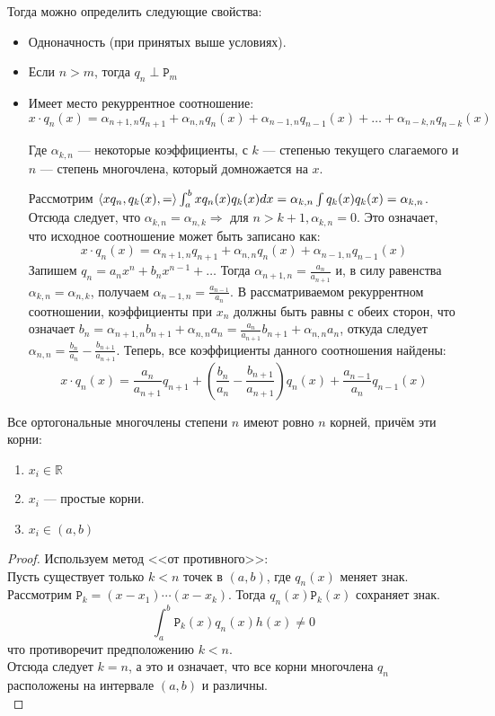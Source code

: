 \documentclass[12pt]{article}
\begin{document}
	Тогда можно определить следующие свойства:
	\begin{itemize}
		\item Одноначность (при принятых выше условиях).
		\item Если $n > m$, тогда $q_n \perp \mathtt{P}_m$
		\item Имеет место рекуррентное соотношение: \\
		$$ x \cdot q_n(x) = 
		\alpha_{n+1,n} q_{n+1} + \alpha_{n,n} q_n(x) + \alpha_{n-1, n} q_{n-1} (x) + \ldots + \alpha_{n-k, n} q_{n-k} (x) $$
		
		Где $\alpha_{k, n}$ --- некоторые коэффициенты, с $k$ --- степенью текущего слагаемого и $n$ --- степень многочлена, который 
		домножается	на $x$.
		
		Рассмотрим $\left\langle x q_n, q_k(x), = \right\rangle \int_a^b x q_n(x) q_k(x) dx = \alpha_{k,n} \int q_k(x) q_k(x) = \alpha_{k,n}$.
		Отсюда следует, что $\alpha_{k,n} = \alpha_{n,k} \Rightarrow$ для $n > k+1,\alpha_{k,n} = 0$. Это означает, что исходное соотношение
		может быть записано как:
		$$ x \cdot q_n(x) = 
		\alpha_{n+1,n} q_{n+1} + \alpha_{n,n} q_n(x) + \alpha_{n-1, n} q_{n-1} (x)$$
		Запишем $q_n = a_n x^n + b_n x^{n-1} + \ldots$
		Тогда $\alpha_{n+1, n} = \frac{a_n}{a_{n+1}}$ и, в силу равенства $\alpha_{k,n} = \alpha_{n,k}$, получаем $\alpha_{n-1, n} 
		= \frac{a_{n-1}}{a_n}$. В рассматриваемом рекуррентном соотношении, коэффициенты при $x_n$ должны быть равны с обеих
		сторон, что означает $b_n = \alpha_{n+1, n} b_{n+1} + \alpha_{n,n} a_n = \frac{a_n}{a_{n+1}} b_{n+1} + \alpha_{n,n} a_n$, 
		откуда следует $\alpha_{n,n} = \frac{b_n}{a_n} - \frac{b_{n+1}}{a_{n+1}}$. Теперь, все коэффициенты данного соотношения
		найдены:
		$$ x \cdot q_n(x) = 
		\frac{a_n}{a_{n+1}} q_{n+1} + (\frac{b_n}{a_n} - \frac{b_{n+1}}{a_{n+1}}) q_n(x) + \frac{a_{n-1}}{a_n} q_{n-1} (x)$$
	\end{itemize}
	
	\begin{state}
		Все ортогональные многочлены степени $n$ имеют ровно $n$ корней, причём эти корни:
		\begin{enumerate}
			\item $x_i \in \mathbb{R}$
			\item $x_i$ --- простые корни.
			\item $x_i \in (a,b)$
		\end{enumerate}
		\begin{proof}
			Используем метод <<от противного>>: \\
			Пусть существует только $k < n$ точек в $(a,b)$, где $q_n(x)$ меняет знак. Рассмотрим 
			$\mathtt{P}_k = (x - x_1) \cdots (x - x_k)$. Тогда $q_n(x) \mathtt{P}_k(x)$ сохраняет знак. 
			$$ \int_a^b \mathtt{P}_k (x) q_n(x) h(x) \neq 0$$
			что противоречит предположению $k < n$. \\
			Отсюда следует $k = n$, а это и означает, что все корни многочлена $q_n$ расположены на интервале $(a,b)$ 
			и различны.\\
		\end{proof}
	\end{state}
\end{document}
